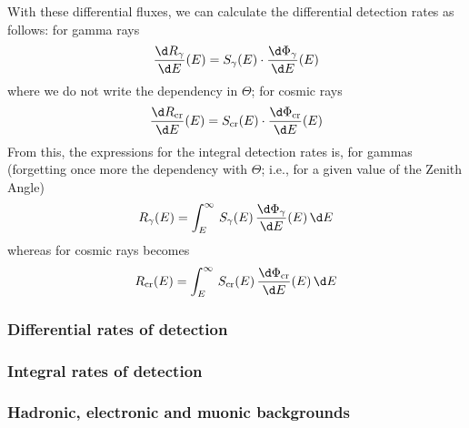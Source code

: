 With these differential fluxes, we can calculate the differential
detection rates as follows: for gamma rays
%
\begin{equation}
  \label{eq:gdRate}
  \frac{\d R_\gamma}{\d E}(E) = S_\gamma(E) \cdot
  \frac{\d\Phi_\gamma}{\d E}(E) 
\end{equation}
%
where we do not write the dependency in $\Theta$; for cosmic rays
%
\begin{equation}
  \label{eq:crdRate}
  \frac{\d R_{\mathrm{cr}}}{\d E}(E) = S_{\mathrm{cr}}(E) \cdot
  \frac{\d\Phi_{\mathrm{cr}}}{\d E}(E) 
\end{equation}
%
From this, the expressions for the integral detection rates is, for
gammas (forgetting once more the dependency with $\Theta$; i.e., for a
given value of the Zenith Angle)
%
\begin{equation}
  \label{eq:gRate}
  R_\gamma(E) = \int_E^\infty \, 
  S_\gamma(E) \, \frac{\d\Phi_\gamma}{\d E}(E) \, \d E
\end{equation}
%
whereas for cosmic rays becomes
%
\begin{equation}
  \label{eq:crRate}
  R_{\mathrm{cr}}(E) = \int_E^\infty \,
  S_{\mathrm{cr}}(E) \, \frac{\d\Phi_{\mathrm{cr}}}{\d E}(E) \, \d E
\end{equation}
%


\subsubsection{Differential rates of detection}

\subsubsection{Integral rates of detection}

\subsubsection{Hadronic, electronic and muonic backgrounds}


\randpoifig



\endinput
%

%
%
%


